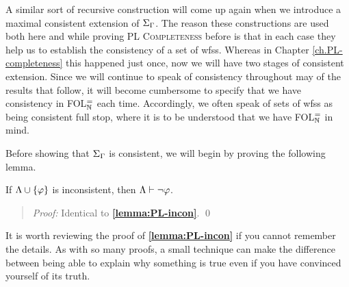 A similar sort of recursive construction will come up again when we introduce a maximal consistent extension of $\Sigma_{\Gamma}$.
The reason these constructions are used both here and while proving \textsc{PL Completeness} before is that in each case they help us to establish the consistency of a set of wfss.
Whereas in Chapter \ref{ch.PL-completeness} this happened just once, now we will have two stages of consistent extension.
Since we will continue to speak of consistency throughout may of the results that follow, it will become cumbersome to specify that we have consistency in FOL$^=_{\mathbb{N}}$ each time. 
Accordingly, we often speak of sets of wfss as being consistent full stop, where it is to be understood that we have FOL$^=_{\mathbb{N}}$ in mind. 

Before showing that $\Sigma_{\Gamma}$ is consistent, we will begin by proving the following lemma.


%
%
%
%

\begin{Lthm} \label{lemma:FOL-incon}
  If $\Lambda\cup\lbrace\varphi\rbrace$ is inconsistent, then $\Lambda\vdash\neg\varphi$. 
\end{Lthm}

\begin{quote} 
  \textit{Proof:}
  Identical to \textbf{\ref{lemma:PL-incon}}.
  \qed
\end{quote}



It is worth reviewing the proof of \textbf{\ref{lemma:PL-incon}} if you cannot remember the details.
As with so many proofs, a small technique can make the difference between being able to explain why something is true even if you have convinced yourself of its truth.



